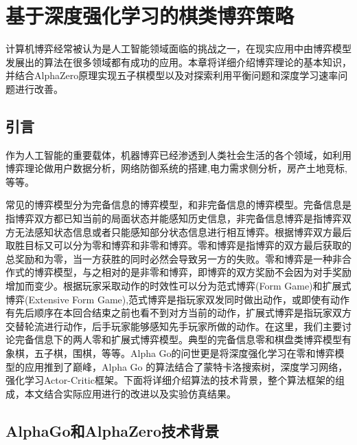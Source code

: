 \chapter{基于深度强化学习的棋类博弈策略}
计算机博弈经常被认为是人工智能领域面临的挑战之一，在现实应用中由博弈模型发展出的算法在很多领域都有成功的应用。本章将详细介绍博弈理论的基本知识，并结合AlphaZero原理实现五子棋模型以及对探索利用平衡问题和深度学习速率问题进行改善。

\section{引言}
作为人工智能的重要载体，机器博弈已经渗透到人类社会生活的各个领域，如利用博弈理论做用户数据分析\cite{吴诚2017基于博弈论的大用户直购电双边决策研究}，网络防御系统的搭建\cite{许晓燕2018基于博弈模型的网络防御},电力需求侧分析\cite{刘晓峰2018博弈论在电力需求侧的应用研究综述}，房产土地竞标\cite{朱传军2011基于模糊测度与模糊积分的房地产评估方法与应用},等等。

常见的博弈模型分为完备信息的博弈模型，和非完备信息的博弈模型。完备信息是指博弈双方都已知当前的局面状态并能感知历史信息，非完备信息博弈是指博弈双方无法感知状态信息或者只能感知部分状态信息进行相互博弈。根据博弈双方最后取胜目标又可以分为零和博弈和非零和博弈。零和博弈是指博弈的双方最后获取的总奖励和为零，当一方获胜的同时必然会导致另一方的失败。零和博弈是一种非合作式的博弈模型，与之相对的是非零和博弈，即博弈的双方奖励不会因为对手奖励增加而变少。根据玩家采取动作的时效性可以分为范式博弈(Form Game)和扩展式博弈(Extensive Form Game),范式博弈是指玩家双发同时做出动作，或即使有动作有先后顺序在本回合结束之前也看不到对方当前的动作，扩展式博弈是指玩家双方交替轮流进行动作，后手玩家能够感知先手玩家所做的动作。在这里，我们主要讨论完备信息下的两人零和扩展式博弈模型。典型的完备信息零和棋盘类博弈模型有象棋，五子棋，围棋，等等。Alpha Go的问世更是将深度强化学习在零和博弈模型的应用推到了巅峰，Alpha Go 的算法结合了蒙特卡洛搜索树，深度学习网络，强化学习Actor-Critic框架。下面将详细介绍算法的技术背景，整个算法框架的组成，本文结合实际应用进行的改进以及实验仿真结果。
\section{AlphaGo和AlphaZero技术背景}

